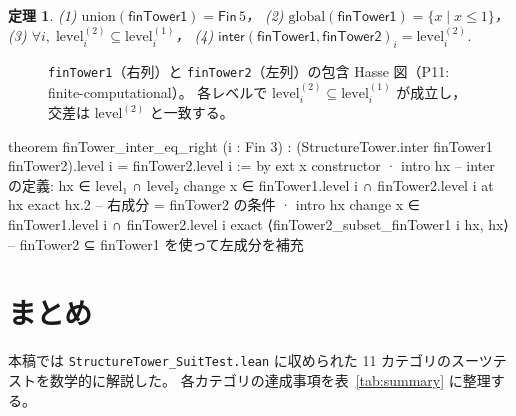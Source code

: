 \documentclass[a4paper,11pt]{ltjsarticle}
\theoremstyle{definition}
\theoremstyle{plain}
\newtheorem{theorem}[definition]{定理}
\theoremstyle{remark}
\newcommand{\lev}{\mathrm{level}}
\newcommand{\union}{\mathrm{union}}
\newcommand{\glob}{\mathrm{global}}
\begin{document}
\begin{theorem}
(1) $\union(\mathsf{finTower1}) = \mathsf{Fin}\,5$，
(2) $\glob(\mathsf{finTower1}) = \{x \mid x \leq 1\}$，
(3) $\forall i,\; \lev^{(2)}_i \subseteq \lev^{(1)}_i$，
(4) $\mathsf{inter}(\mathsf{finTower1}, \mathsf{finTower2})_i = \lev^{(2)}_i$.
\end{theorem}

\begin{figure}[H]
\centering
{}
\caption{\texttt{finTower1}（右列）と \texttt{finTower2}（左列）の包含 Hasse 図（P11: finite-computational）。
  各レベルで $\lev^{(2)}_i \subseteq \lev^{(1)}_i$ が成立し，交差は $\lev^{(2)}$ と一致する。}
\label{fig:fintower-hasse}
\end{figure}

\begin{leancode}[caption={finTower の交差が小さい塔と一致（P11: finite-computational）}]
theorem finTower_inter_eq_right (i : Fin 3) :
    (StructureTower.inter finTower1 finTower2).level i = finTower2.level i := by
  ext x
  constructor
  · intro hx
    -- inter の定義: hx ∈ level₁ ∩ level₂
    change x ∈ finTower1.level i ∩ finTower2.level i at hx
    exact hx.2   -- 右成分 = finTower2 の条件
  · intro hx
    change x ∈ finTower1.level i ∩ finTower2.level i
    exact ⟨finTower2_subset_finTower1 i hx, hx⟩
    -- finTower2 ⊆ finTower1 を使って左成分を補充
\end{leancode}

\section{まとめ}\label{sec:conclusion}

本稿では \texttt{StructureTower\_SuitTest.lean} に収められた
11 カテゴリのスーツテストを数学的に解説した。
各カテゴリの達成事項を表~\ref{tab:summary} に整理する。
\end{document}
